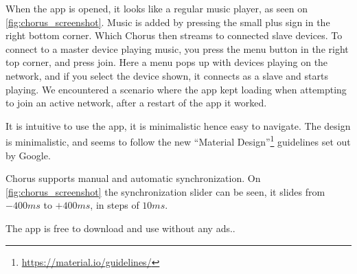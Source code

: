 When the app is opened, it looks like a regular music player, as seen on \cref{fig:chorus_screenshot}.
Music is added by pressing the small plus sign in the right bottom corner.
Which Chorus then streams to connected slave devices.
To connect to a master device playing music, you press the menu button in the right top corner, and press join.
Here a menu pops up with devices playing on the network, and if you select the device shown, it connects as a slave and starts playing.
We encountered a scenario where the app kept loading when attempting to join an active network, after a restart of the app it worked.

It is intuitive to use the app, it is minimalistic hence easy to navigate.
The design is minimalistic, and seems to follow the new ``Material Design''\footnote{\url{https://material.io/guidelines/}} guidelines set out by Google.

Chorus supports manual and automatic synchronization.
On \cref{fig:chorus_screenshot} the synchronization slider can be seen,
it slides from $-400ms$ to $+400ms$, in steps of $10 ms$.

The app is free to download and use without any ads.\cite{chrous_play}.

